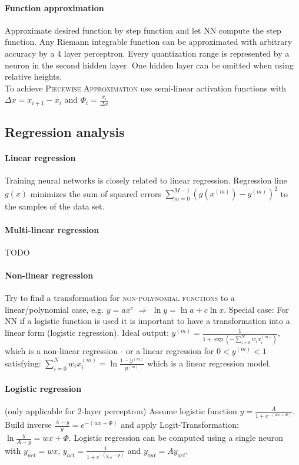 \paragraph{Function approximation}
Approximate desired function by step function and let NN compute the step function. Any Riemann integrable function can be approximated with arbitrary accuracy by a 4 layer perceptron. Every quantization range is represented by a neuron in the second hidden layer. One hidden layer can be omitted when using relative heights.\\
To achieve \textsc{Piecewise Approximation} use semi-linear activation functions with $\Delta x = x_{i+1} - x_i$ and $\Phi_i = \frac{x_i}{\Delta x}$


\subsection{Regression analysis}
\paragraph{Linear regression} 
Training neural networks is closely related to linear regression. Regression line $g(x)$ minimizes the sum of squared errors $\sum_{m=0}^{M-1} (g(x^{(m)})-y^{(m)})^2$ to the samples of the data set.

\paragraph{Multi-linear regression}
TODO

\paragraph{Non-linear regression}
Try to find a transformation for  \textsc{non-polynomial functions} to a linear/polynomial case, e.g. $y=ax^c$ $\Rightarrow$ $\ln y = \ln a + c \ln x$. Special case: For NN if a logistic function is used it is important to have a transformation into a linear form (logistic regression). Ideal output: $y^{(m)}=\frac{1}{1+\exp\left(-\sum_{i=0}^N w_i x_i^{(m)}\right)}$, which is a non-linear regression - or a linear regression for $0<y^{(m)}<1$ satisfying: $\sum_{i=0}^N w_i x_i^{(m)} = \ln \frac{1-y^{(m)}}{y^{(m)}}$ which is a linear regression model.

\paragraph{Logistic regression} (only applicable for 2-layer perceptron)
Assume logistic function $y=\frac{A}{1+e^{-(wx+\Phi)}}$. Build inverse $\frac{A-y}{y}=e^{-(wx+\Phi)}$ and apply Logit-Transformation: $\ln \frac{y}{A-y}=wx+\Phi$. Logistic regression can be computed using a single neuron with $y_{net}=wx$, $y_{act}=\frac{1}{1+e^{-(y_{net}-\Phi)}}$ and $y_{out}=Ay_{act}$.


